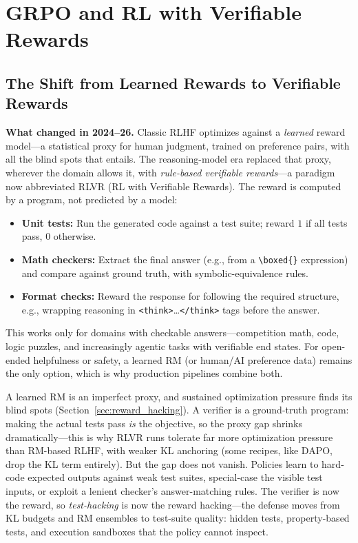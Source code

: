 \section{GRPO and RL with Verifiable Rewards}
\label{sec:grpo_rlvr}

\subsection{The Shift from Learned Rewards to Verifiable Rewards}

\textbf{What changed in 2024--26.} Classic RLHF optimizes against a \textit{learned} reward model---a statistical proxy for human judgment, trained on preference pairs, with all the blind spots that entails. The reasoning-model era replaced that proxy, wherever the domain allows it, with \textit{rule-based verifiable rewards}---a paradigm now abbreviated RLVR (RL with Verifiable Rewards). The reward is computed by a program, not predicted by a model:
\begin{itemize}
    \item \textbf{Unit tests:} Run the generated code against a test suite; reward $1$ if all tests pass, $0$ otherwise.
    \item \textbf{Math checkers:} Extract the final answer (e.g., from a \texttt{\textbackslash boxed\{\}} expression) and compare against ground truth, with symbolic-equivalence rules.
    \item \textbf{Format checks:} Reward the response for following the required structure, e.g., wrapping reasoning in \texttt{<think>}\ldots\texttt{</think>} tags before the answer.
\end{itemize}
This works only for domains with checkable answers---competition math, code, logic puzzles, and increasingly agentic tasks with verifiable end states. For open-ended helpfulness or safety, a learned RM (or human/AI preference data) remains the only option, which is why production pipelines combine both.

\begin{keyinsight}
A learned RM is an imperfect proxy, and sustained optimization pressure finds its blind spots (Section~\ref{sec:reward_hacking}). A verifier is a ground-truth program: making the actual tests pass \textit{is} the objective, so the proxy gap shrinks dramatically---this is why RLVR runs tolerate far more optimization pressure than RM-based RLHF, with weaker KL anchoring (some recipes, like DAPO, drop the KL term entirely). But the gap does not vanish. Policies learn to hard-code expected outputs against weak test suites, special-case the visible test inputs, or exploit a lenient checker's answer-matching rules. The verifier is now the reward, so \textit{test-hacking} is now the reward hacking---the defense moves from KL budgets and RM ensembles to test-suite quality: hidden tests, property-based tests, and execution sandboxes that the policy cannot inspect.
\end{keyinsight}

